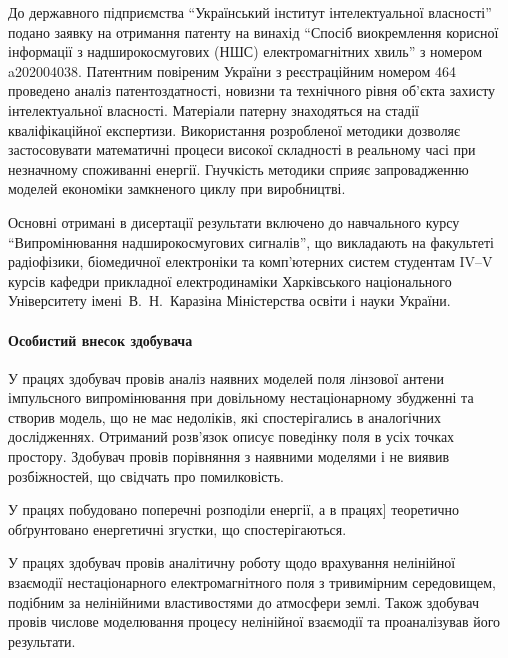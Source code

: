 До державного підприємства ``Український інститут інтелектуальної 
власності'' подано заявку на отримання патенту на  винахід 
``Спосіб виокремлення корисної інформації з надширокосмугових (НШС) 
електромагнітних хвиль'' з номером a202004038. Патентним 
повіреним України з реєстраційним номером 464 проведено аналіз
патентоздатності, новизни та технічного рівня об'єкта захисту 
інтелектуальної власності. Матеріали патерну знаходяться на 
стадії кваліфікаційної експертизи. Використання розробленої 
методики дозволяє застосовувати математичні процеси високої 
складності в реальному часі при незначному споживанні енергії. 
Гнучкість методики  сприяє запровадженню моделей економіки 
замкненого циклу при виробництві.

Основні отримані в дисертації результати включено до навчального 
курсу ``Випромінювання надширокосмугових сигналів'', що викладають 
на факультеті радіофізики, біомедичної електроніки та комп’ютерних 
систем студентам IV--V курсів кафедри прикладної електродинаміки
Харківського національного Університету імені~В.~Н.~Каразіна 
Міністерства освіти і науки України.


\paragraph{Особистий внесок здобувача}

У працях \cite{my:Telecom2018, my:UKRCON2017, my:UKRCON2019} здобувач провів
аналіз наявних моделей поля лінзової антени імпульсного випромінювання 
при довільному нестаціонарному збудженні та створив модель, що не має недоліків,
які спостерігались в аналогічних дослідженнях. Отриманий розв'язок описує 
поведінку поля в усіх точках простору. Здобувач провів порівняння з 
наявними моделями і не виявив розбіжностей, що свідчать про помилковість.

У працях \cite{my:Vesnik2017-2} побудовано поперечні розподіли енергії, а
в працях] \cite{my:Vesnik2018, my:Vesnik2018-2} теоретично обґрунтовано енергетичні 
згустки, що спостерігаються.

У працях \cite{my:Vesnik2015, my:Vesnik2017, my:Vesnik2017-2, my:MMET2014, 
my:UWBUSIS2014, my:ICATT2015, my:UWBUSIS2016, my:KPI2016, my:DIPED2019} 
здобувач провів аналітичну роботу щодо врахування нелінійної взаємодії 
нестаціонарного електромагнітного поля з тривимірним середовищем, 
подібним за нелінійними властивостями до атмосфери землі. Також здобувач
провів числове моделювання процесу нелінійної взаємодії та проаналізував 
його результати.

